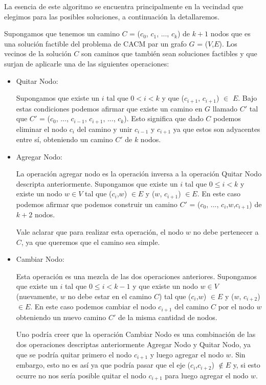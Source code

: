 La esencia de este algoritmo se encuentra principalmente en la vecindad que elegimos para las posibles soluciones, a continuación la detallaremos.

Supongamos que tenemos un camino $C$ = ($c_0$, $c_1$, ..., $c_k$) de $k+1$ nodos que es una solución factible del problema de CACM par un grafo $G$ = ($V$,$E$). Los vecinos de la solución $C$ son caminos que también sean soluciones factibles y que surjan de aplicarle una de las siguientes operaciones:

\begin{itemize}
 \item Quitar Nodo:

  Supongamos que existe un $i$ tal que $0 < i < k$ y que ($c_{i+1}$, $c_{i+1}$) $\in$ $E$. Bajo estas condiciones podemos afirmar que existe un camino en $G$ llamado $C'$ tal que $C'$ = ($c_0$, ..., $c_{i-1}$, $c_{i+1}$, ..., $c_k$). Esto significa que dado $C$ podemos eliminar el nodo $c_i$ del camino y unir $c_{i-1}$ y $c_{i+1}$ ya que estos son adyacentes entre sí, obteniendo un camino $C'$ de $k$ nodos.
  \item Agregar Nodo:

  La operación agregar nodo es la operación inversa a la operación Quitar Nodo descripta anteriormente. Supongamos que existe un $i$ tal que $0 \leq i < k$ y existe un nodo $w \in V$ tal que ($c_i$,$w$) $\in E$ y ($w$, $c_{i+1}$) $\in E$. En este caso podemos afirmar que podemos construir un camino $C'$ = ($c_0$, ..., $c_{i}$,$w$,$c_{i+1}$) de $k+2$ nodos.

  Vale aclarar que para realizar esta operación, el nodo $w$ no debe pertenecer a $C$, ya que queremos que el camino sea simple.

  \item Cambiar Nodo:

  Esta operación es una mezcla de las dos operaciones anteriores. Supongamos que existe un $i$ tal que $0 \leq i < k-1$ y que existe un nodo $w \in V$ (nuevamente, $w$ no debe estar en el camino $C$) tal que ($c_i$,$w$) $\in E$ y ($w$, $c_{i+2}$) $\in E$. En este caso podemos cambiar el nodo $c_{i+1}$ del camino $C$ por el nodo $w$ obteniendo un nuevo camino $C'$ de la misma cantidad de nodos.

  Uno podría creer que la operación Cambiar Nodo es una combinación de las dos operaciones descriptas anteriormente Agregar Nodo y Quitar Nodo, ya que se podría quitar primero el nodo $c_{i+1}$ y luego agregar el nodo $w$. Sin embargo, esto no es así ya que podría pasar que el eje ($c_i$,$c_{i+2}$) $\notin E$ y, si esto ocurre no nos sería posible quitar el nodo $c_{i+1}$ para luego agregar el nodo $w$.

\end{itemize}
 
